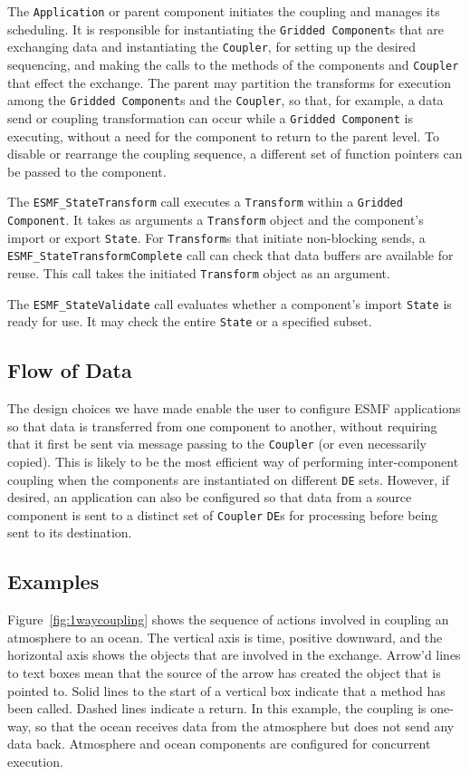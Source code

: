 The {\tt Application} or parent component initiates the coupling and manages 
its scheduling.  It is responsible for instantiating the {\tt Gridded Component}s
that are exchanging data and instantiating the {\tt Coupler}, for setting up the desired 
sequencing, and making the calls to the methods of the components and 
{\tt Coupler} that effect the exchange.  The parent may partition the 
transforms
for execution among the {\tt Gridded Component}s and the {\tt Coupler}, so that, for 
example, a data send or coupling transformation can occur while a {\tt Gridded 
Component} is executing, without a need for the component to return to the
parent level.  
To disable or rearrange the coupling sequence, a different set of function
pointers can be passed to the component.

The {\tt ESMF\_StateTransform} call executes a {\tt Transform} 
within a {\tt Gridded Component}.  It takes as arguments a
{\tt Transform} object and the component's import or export {\tt State}.  
For {\tt Transform}s that initiate non-blocking sends, a {\tt ESMF\_StateTransformComplete} 
call can check that data  buffers are available for reuse.  This 
call takes the initiated {\tt Transform} object as an argument.

The {\tt ESMF\_StateValidate} call evaluates whether a component's 
import {\tt State} is ready for use.  It may check the entire {\tt State} or 
a specified subset.

\subsection{Flow of Data}
\label{sec:dataflow}
The design choices we have made enable the user to configure ESMF
applications so that data is transferred from one component to another, 
without requiring that it first be sent via message passing to the
{\tt Coupler} (or even necessarily
copied).  This is likely to be the most efficient way of performing 
inter-component coupling when the components are instantiated on different
{\tt DE} sets.  However, if desired, an application can also be configured so that
data from a source component is sent to a distinct set of {\tt Coupler} 
{\tt DE}s for processing before being sent to its destination.

\subsection{Examples}

Figure~\ref{fig:1waycoupling} shows the sequence of actions involved
in coupling an atmosphere to an ocean.  The vertical axis is time, positive
downward, and the horizontal axis shows the objects that are involved in the
exchange.  Arrow'd lines to text boxes mean that the source of the arrow has 
created the object that is pointed to.  Solid lines to the start of a vertical
box indicate that a method has been called.  Dashed lines indicate a return.  
In this example, the coupling is one-way, so that the ocean 
receives data from the atmosphere but does not send any data back.  Atmosphere
and ocean components are configured for concurrent execution.

